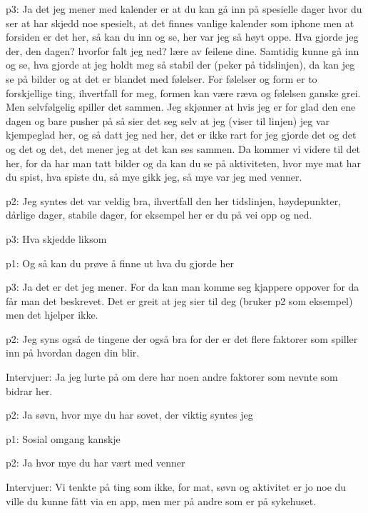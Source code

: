 \documentclass[11pt,UKenglish, a4paper]{article}
\begin{document}
\textcolor{myR} {p3:} Ja det jeg mener med kalender er at du kan gå inn på spesielle dager hvor du ser at har skjedd noe spesielt, at det finnes vanlige kalender som iphone men at forsiden er det her, så kan du inn og se, her var jeg så høyt oppe. Hva gjorde jeg der, den dagen? hvorfor falt jeg ned? lære av feilene dine. Samtidig kunne gå inn og se, hva gjorde at jeg holdt meg så stabil der (peker på tidslinjen), da kan jeg se på bilder og at det er blandet med følelser. For følelser og form er to forskjellige ting, ihvertfall for meg, formen kan være ræva og følelsen ganske grei. Men selvfølgelig spiller det sammen. Jeg skjønner at hvis jeg er for glad den ene dagen og bare pusher på så sier det seg selv at jeg (viser til linjen) jeg var kjempeglad her, og så datt jeg ned her, det er ikke rart for jeg gjorde det og det og det og det, det mener jeg at det kan ses sammen. Da kommer vi videre til det her, for da har man tatt bilder og da kan du se på aktiviteten, hvor mye mat har du spist, hva spiste du, så mye gikk jeg, så mye var jeg med venner.

\textcolor{myYellow} {p2:} Jeg syntes det var veldig bra, ihvertfall den her tidslinjen, høydepunkter, dårlige dager, stabile dager, for eksempel her er du på vei opp og ned. 

\textcolor{myR} {p3:} Hva skjedde liksom

\textcolor{myGreen} {p1:} Og så kan du prøve å finne ut hva du gjorde her

\textcolor{myR} {p3:} Ja det er det jeg mener. For da kan man komme seg kjappere oppover for da får man det beskrevet. Det er greit at jeg sier til deg (bruker p2 som eksempel) men det hjelper ikke.

\textcolor{myYellow} {p2:} Jeg syns også de tingene der også bra for der er det flere faktorer som spiller inn på hvordan dagen din blir.

\textcolor{myBlue} {Intervjuer:} Ja jeg lurte på om dere har noen andre faktorer som nevnte som bidrar her.

\textcolor{myYellow} {p2:} Ja søvn, hvor mye du har sovet,  der viktig syntes jeg

\textcolor{myGreen} {p1:} Sosial omgang kanskje

\textcolor{myYellow} {p2:} Ja hvor mye du har vært med venner

\textcolor{myBlue} {Intervjuer:} Vi tenkte på ting som ikke, for mat, søvn og aktivitet er jo noe du ville du kunne fått via en app, men mer på andre som er på sykehuset.
\end{document}
